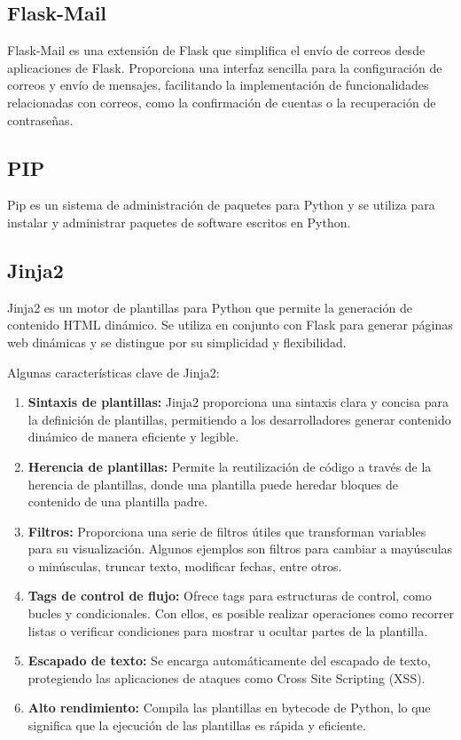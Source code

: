 \documentclass[a4paper, 12pt]{book}
\begin{document}
\subsection{Flask-Mail}
\label{subsec:flaskmail} 
Flask-Mail es una extensión de Flask que simplifica el envío de correos desde aplicaciones de Flask. Proporciona una interfaz sencilla 
para la configuración de correos y envío de mensajes, facilitando la implementación de funcionalidades relacionadas con correos, como la confirmación de cuentas 
o la recuperación de contraseñas.
\subsection{PIP} 
\label{subsec:pip} 
Pip es un sistema de administración de paquetes para Python y se utiliza para instalar y administrar paquetes de software escritos en Python.
\subsection{Jinja2}
\label{subsec:jinja2} 
Jinja2 es un motor de plantillas para Python que permite la generación de contenido HTML dinámico. Se utiliza en conjunto con Flask para 
generar páginas web dinámicas y se distingue por su simplicidad y flexibilidad. 

Algunas características clave de Jinja2:

\begin{enumerate}
  \item \textbf{Sintaxis de plantillas:} Jinja2 proporciona una sintaxis clara y concisa para la definición de plantillas, permitiendo a los desarrolladores generar 
  contenido dinámico de manera eficiente y legible.
  \item \textbf{Herencia de plantillas:} Permite la reutilización de código a través de la herencia de plantillas, donde una plantilla puede heredar bloques de contenido 
  de una plantilla padre.
  \item \textbf{Filtros:} Proporciona una serie de filtros útiles que transforman variables para su visualización. Algunos ejemplos son filtros para cambiar a mayúsculas 
  o minúsculas, truncar texto, modificar fechas, entre otros.
  \item \textbf{Tags de control de flujo:} Ofrece tags para estructuras de control, como bucles y condicionales. Con ellos, es posible realizar operaciones como recorrer 
  listas o verificar condiciones para mostrar u ocultar partes de la plantilla.
  \item \textbf{Escapado de texto:} Se encarga automáticamente del escapado de texto, protegiendo las aplicaciones de ataques como Cross Site Scripting (XSS).
  \item \textbf{Alto rendimiento:} Compila las plantillas en bytecode de Python, lo que significa que la ejecución de las plantillas es rápida y eficiente.
\end{enumerate}
\end{document}
